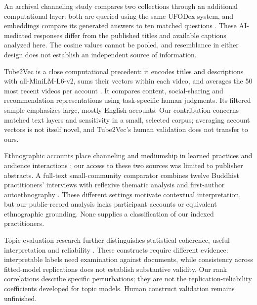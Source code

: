 An archival channeling study compares two collections through an additional computational layer: both are queried using the same UFODex system, and embeddings compare its generated answers to ten matched questions \citep{wahbeh2026records}. These AI-mediated responses differ from the published titles and available captions analyzed here. The cosine values cannot be pooled, and resemblance in either design does not establish an independent source of information.

Tube2Vec is a close computational precedent: it encodes titles and descriptions with all-MiniLM-L6-v2, sums their vectors within each video, and averages the 50 most recent videos per account \citep{boesinger2024tube2vec}. It compares content, social-sharing and recommendation representations using task-specific human judgments. Its filtered sample emphasizes large, mostly English accounts. Our contribution concerns matched text layers and sensitivity in a small, selected corpus; averaging account vectors is not itself novel, and Tube2Vec's human validation does not transfer to ours.

Ethnographic accounts place channeling and mediumship in learned practices and audience interactions \citep{klinoron2014channel,tomlinson2019medium}; our access to these two sources was limited to publisher abstracts. A full-text small-community comparator combines twelve Buddhist practitioners' interviews with reflexive thematic analysis and first-author autoethnography \citep{claisse2023faith}. These different settings motivate contextual interpretation, but our public-record analysis lacks participant accounts or equivalent ethnographic grounding. None supplies a classification of our indexed practitioners.

Topic-evaluation research further distinguishes statistical coherence, useful interpretation and reliability \citep{doogan2021twaddle,hoyle2021incoherence,schroeder2025reliability}. These constructs require different evidence: interpretable labels need examination against documents, while consistency across fitted-model replications does not establish substantive validity. Our rank correlations describe specific perturbations; they are not the replication-reliability coefficients developed for topic models. Human construct validation remains unfinished.
